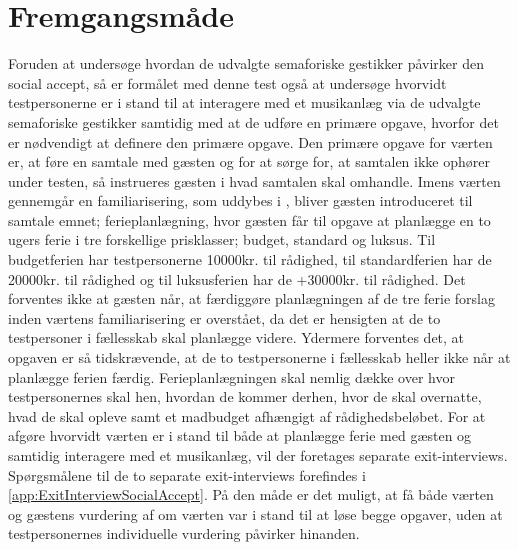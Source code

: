 \section{Fremgangsmåde}
\label{FremgangsmaadeSocialAccept}
%
Foruden at undersøge hvordan de udvalgte semaforiske gestikker påvirker den social accept, så er formålet med denne test også at undersøge hvorvidt testpersonerne er i stand til at interagere med et musikanlæg via de udvalgte semaforiske gestikker samtidig med at de udføre en primære opgave, hvorfor det er nødvendigt at definere den primære opgave. Den primære opgave for værten er, at føre en samtale med gæsten og for at sørge for, at samtalen ikke ophører under testen, så instrueres gæsten i hvad samtalen skal omhandle. Imens værten gennemgår en familiarisering, som uddybes i , bliver gæsten introduceret til samtale emnet; ferieplanlægning, hvor gæsten får til opgave at planlægge en to ugers ferie i tre forskellige prisklasser; budget, standard og luksus. Til budgetferien har testpersonerne 10000kr. til rådighed, til standardferien har de 20000kr. til rådighed og til luksusferien har de +30000kr. til rådighed. Det forventes ikke at gæsten når, at færdiggøre planlægningen af de tre ferie forslag inden værtens familiarisering er overstået, da det er hensigten at de to testpersoner i fællesskab skal planlægge videre. Ydermere forventes det, at opgaven er så tidskrævende, at de to testpersonerne i fællesskab heller ikke når at planlægge ferien færdig. Ferieplanlægningen skal nemlig dække over hvor testpersonernes skal hen, hvordan de kommer derhen, hvor de skal overnatte, hvad de skal opleve samt et madbudget afhængigt af rådighedsbeløbet. For at afgøre hvorvidt værten er i stand til både at planlægge ferie med gæsten og samtidig interagere med et musikanlæg, vil der foretages separate exit-interviews. Spørgsmålene til de to separate exit-interviews forefindes i \autoref{app:ExitInterviewSocialAccept}. På den måde er det muligt, at få både værten og gæstens vurdering af om værten var i stand til at løse begge opgaver, uden at testpersonernes individuelle vurdering påvirker hinanden. \blankline
%
